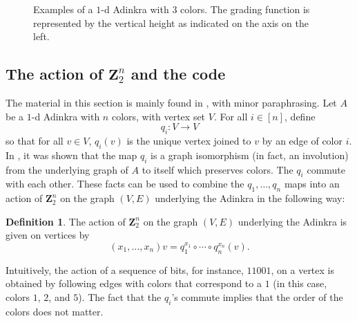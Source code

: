 \documentclass[12pt,twoside,singlespace]{article}
\numberwithin{equation}{section}
\theoremstyle{definition}
\newtheorem{definition}[equation]{Definition}
\newcommand{\ZZ}{\mathbf{Z}}
\begin{document}
\begin{figure}
\begin{center}
\caption{Examples of a $1$-d Adinkra with $3$ colors.  The grading function is represented by the vertical height as indicated on the axis on the left.
\label{fig:1d-examples}}
\end{center}
\end{figure}


\subsection{The action of $\ZZ_2^n$ and the code}
\label{sec:code}
The material in this section is mainly found in \cite{d2l:omni,zhang:adinkras}, with minor paraphrasing.  Let $A$ be a $1$-d Adinkra with $n$ colors, with vertex set $V$.  For all $i\in [n]$, define
\[q_i:V\to V\]
so that for all $v\in V$, $q_i(v)$ is the unique vertex joined to $v$ by an edge of color $i$.  In \cite{d2l:omni}, it was shown that the map $q_i$ is a graph isomorphism (in fact, an involution) from the underlying graph of $A$ to itself which preserves colors. The $q_i$ commute with each other. These facts can be used to combine the $q_1,\ldots, q_n$ maps into an action of $\ZZ_2^n$ on the graph $(V,E)$ underlying the Adinkra in the following way:
\begin{definition}
The action of $\ZZ_2^n$ on the graph $(V,E)$ underlying the Adinkra is given on vertices by
\[(x_1,\ldots,x_n)v=q_1^{x_1}\circ\cdots\circ q_n^{x_n}(v).\]
\end{definition}

Intuitively, the action of a sequence of bits, for instance, $11001$, on a vertex is obtained by following edges with colors that correspond to a $1$ (in this case, colors $1$, $2$, and $5$).  The fact that the $q_i$'s commute implies that the order of the colors does not matter.
\end{document}
